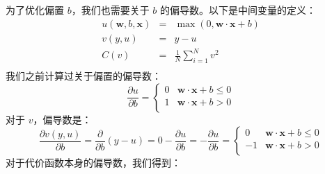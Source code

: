 \documentclass[11pt]{article}
\begin{document}
为了优化偏置 $b$，我们也需要关于 $b$ 的偏导数。以下是中间变量的定义：
\[
\begin{array}{lllllllll}
 u(\mathbf{w},b,\mathbf{x}) &=& \max(0, \mathbf{w}\cdot\mathbf{x}+b)\\
 v(y,u) &=& y - u\\
 C(v) &=& \frac{1}{N} \sum_{i=1}^N v^2\\
\end{array}
\]
我们之前计算过关于偏置的偏导数：
\[\frac{\partial u}{\partial b} = \begin{cases}
	0 & \mathbf{w} \cdot \mathbf{x} + b \leq 0\\
	1 & \mathbf{w} \cdot \mathbf{x} + b > 0\\
\end{cases}\]
对于 $v$，偏导数是：
\[\frac{\partial v(y,u)}{\partial b} = \frac{\partial}{\partial b} (y - u) = 0 - \frac{\partial u}{\partial b} = -\frac{\partial u}{\partial b} = \begin{cases}
	0 & \mathbf{w} \cdot \mathbf{x} + b \leq 0\\
	-1 & \mathbf{w} \cdot \mathbf{x} + b > 0\\
\end{cases}\]
对于代价函数本身的偏导数，我们得到：
\end{document}
